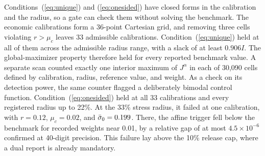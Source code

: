 Conditions~(\ref{eq:unique}) and (\ref{eq:onesided}) have closed forms in the calibration and the radius, so a gate can check them without solving the benchmark. The economic calibrations form a 36-point Cartesian grid, and removing three cells violating $r>\mu_c$ leaves 33 admissible calibrations. Condition~(\ref{eq:unique}) held at all of them across the admissible radius range, with a slack of at least $0.906I$. The global-maximizer property therefore held for every reported benchmark value. A separate scan counted exactly one interior maximum of $J^{\alpha}$ in each of 30,090 cells defined by calibration, radius, reference value, and weight. As a check on its detection power, the same counter flagged a deliberately bimodal control function. Condition~(\ref{eq:onesided}) held at all 33 calibrations and every registered radius up to 22\%. At the 33\% stress radius, it failed at one calibration, with $r=0.12$, $\mu_c=0.02$, and $\bar{\sigma}_0=0.199$. There, the affine trigger fell below the benchmark for recorded weights near 0.01, by a relative gap of at most $4.5\times10^{-6}$ confirmed at 40-digit precision. This failure lay above the 10\% release cap, where a dual report is already mandatory.

